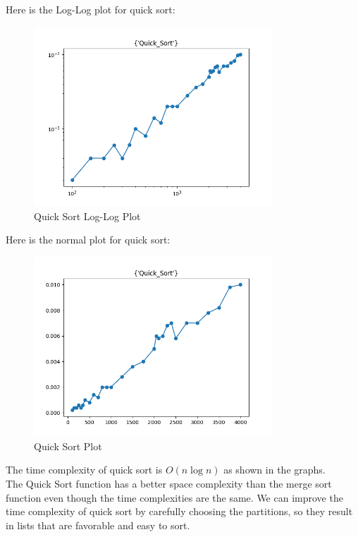 \documentclass{article}
\begin{document}
Here is the Log-Log plot for quick sort:
\begin{figure}
    \centering
    \includegraphics*[width=0.8\textwidth]{img/loglog_Quick_Sort.png}
    \caption{Quick Sort Log-Log Plot}
\end{figure}

Here is the normal plot for quick sort:
\begin{figure}
    \centering
    \includegraphics*[width=0.8\textwidth]{img/plot_Quick_Sort.png}
    \caption{Quick Sort Plot}
\end{figure}

The time complexity of quick sort is $O(n \log n)$ as shown in the graphs. \\

The Quick Sort function has a better space complexity than the merge sort function even though the time complexities are the same. We can improve the time complexity of quick sort by carefully choosing the partitions, so they result in lists that are favorable and easy to sort.
\end{document}
